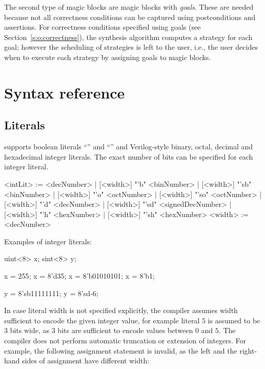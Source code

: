 The second type of magic blocks are magic blocks with 
\emph{goals}.  These are needed because not all correctness 
conditions can be captured using postconditions and assertions.  
For correctness conditions specified using goals (see 
Section~\ref{s:o:correctness}), the synthesis algorithm computes a 
strategy for each goal; however the scheduling of strategies is 
left to the user, i.e., the user decides when to execute each 
strategy by assigning goals to magic blocks. 


\section{Syntax reference}

\subsection{Literals}\label{s:r:literals}

\tsl supports boolean literals ``'' and ``'' 
and Verilog-style binary, octal, decimal and hexadecimal integer 
literals.  The exact number of bits can be specified for each 
integer literal.  

\begin{bnflisting}
<intLit> := <decNumber>
          | [<width>] "'b"  <binNumber>
          | [<width>] "'sb" <binNumber>
          | [<width>] "'o"  <octNumber>
          | [<width>] "'so" <octNumber>
          | [<width>] "'d"  <decNumber>
          | [<width>] "'sd" <signedDecNumber>
          | [<width>] "'h"  <hexNumber>
          | [<width>] "'sh" <hexNumber>
<width> := <decNumber>
\end{bnflisting}

Examples of integer literals:
\begin{tsllisting2}
uint<8> x;
sint<8> y;

x = 255;
x = 8'd35;
x = 8'b01010101;
x = 8'b1;

y = 8'sb11111111;
y = 8'sd-6;
\end{tsllisting2}

In case literal width is not specified explicitly, the compiler 
assumes width sufficient to encode the given integer value, for 
example literal $5$ is assumed to be $3$ bits wide, as $3$ bits 
are sufficient to encode values between $0$ and $5$.  The compiler 
does not perform automatic truncation or extension of integers.  
For example, the following assignment statement is invalid, as the 
left and the right-hand sides of assignment have different width:

